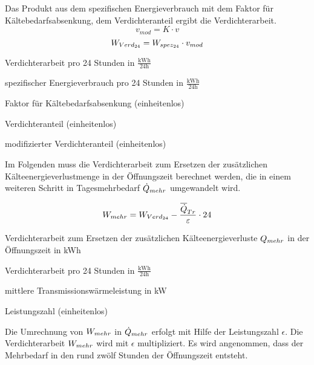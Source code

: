 Das Produkt aus dem spezifischen Energieverbrauch mit dem Faktor für
Kältebedarfsabsenkung, dem Verdichteranteil ergibt die Verdichterarbeit.
\begin{equation}
	v_{mod} = K \cdot v
\label{vmod}
\end{equation}
\begin{equation}
	\lverd = \lspez \cdot v_{mod}
\label{lverd}
\end{equation}

\begin{description}[\dth]

	\item[$\lverd$] Verdichterarbeit pro 24 Stunden in
	$\mathrm{\frac{kWh}{24h}}$
	\item[$\lspez$] spezifischer Energieverbrauch pro 24 Stunden in
		$\mathrm{\frac{kWh}{24h}}$
	\item[$K$] Faktor für Kältebedarfsabsenkung (einheitenlos)
	\item[$v$] Verdichteranteil (einheitenlos)
	\item[$v_{mod}$] modifizierter Verdichteranteil (einheitenlos)

\end{description}
\vspace{0.5cm}

Im Folgenden muss die Verdichterarbeit zum Ersetzen der zus\"atzlichen
K\"alteenergieverlustmenge in der \"Offnungszeit berechnet werden, die in einem
weiteren Schritt in Tagesmehrbedarf $\dot{Q}_{mehr}$ umgewandelt wird.

\begin{equation}
	\lmehr = \lverd - \frac{\aptrans}{\epsilon} \cdot 24
\label{lmehr}
\end{equation}

\begin{description}[\dth]

	\item[$\lmehr$] Verdichterarbeit zum Ersetzen der zus\"atzlichen
	K\"alteenergieverluste $Q_{mehr}$ in der \"Offnungszeit in kWh
	\item[$\lverd$] Verdichterarbeit pro 24 Stunden in
	$\mathrm{\frac{kWh}{24h}}$
	\item[$\aptrans$] mittlere Transmissionswärmeleistung in kW
	\item[$\epsilon$] Leistungszahl (einheitenlos)

\end{description}
\vspace{0.5cm}

Die Umrechnung von $\lmehr$ in $\dot{Q}_{mehr}$ erfolgt mit Hilfe der Leistungszahl
$\epsilon$. Die Verdichterarbeit $\lmehr$ wird mit $\epsilon$ multipliziert.
Es wird angenommen, dass der Mehrbedarf in den rund zw\"olf Stunden der
\"Offnungszeit entsteht.

